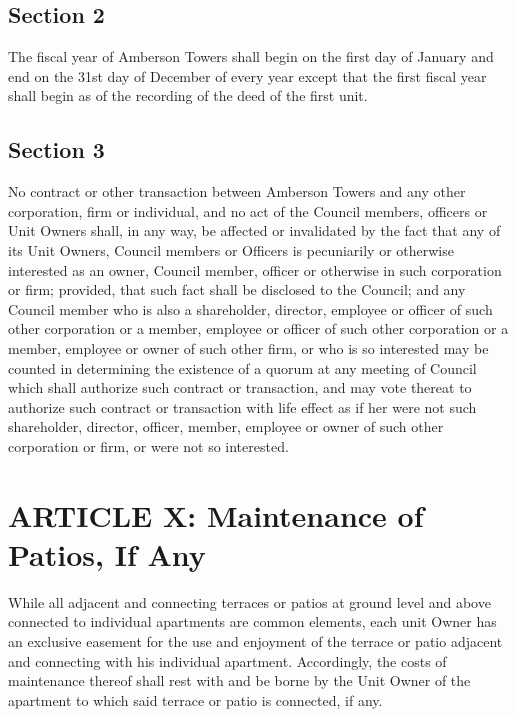 \documentclass[
  14pt,
]{book}
\begin{document}
\hypertarget{section-2-7}{%
\subsection*{Section 2}\label{section-2-7}}

The fiscal year of Amberson Towers shall begin on the first day of January and end on the 31st day of December of every year except that the first fiscal year shall begin as of the recording of the deed of the first unit.

\hypertarget{section-3-4}{%
\subsection*{Section 3}\label{section-3-4}}

No contract or other transaction between Amberson Towers and any other corporation, firm or individual, and no act of the Council members, officers or Unit Owners shall, in any way, be affected or invalidated by the fact that any of its Unit Owners, Council members or Officers is pecuniarily or otherwise interested as an owner, Council member, officer or otherwise in such corporation or firm; provided, that such fact shall be disclosed to the Council; and any Council member who is also a shareholder, director, employee or officer of such other corporation or a member, employee or officer of such other corporation or a member, employee or owner of such other firm, or who is so interested may be counted in determining the existence of a quorum at any meeting of Council which shall authorize such contract or transaction, and may vote thereat to authorize such contract or transaction with life effect as if her were not such shareholder, director, officer, member, employee or owner of such other corporation or firm, or were not so interested.

\hypertarget{article-x-maintenance-of-patios-if-any}{%
\section*{ARTICLE X: Maintenance of Patios, If Any}\label{article-x-maintenance-of-patios-if-any}}

While all adjacent and connecting terraces or patios at ground level and above connected to individual apartments are common elements, each unit Owner has an exclusive easement for the use and enjoyment of the terrace or patio adjacent and connecting with his individual apartment. Accordingly, the costs of maintenance thereof shall rest with and be borne by the Unit Owner of the apartment to which said terrace or patio is connected, if any.
\end{document}
